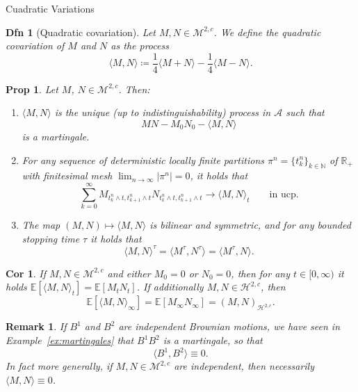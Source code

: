 \documentclass[a4paper]{article}
\theoremstyle{mytheoremstyle}
\newtheorem{definition}{Dfn}
\newtheorem{proposition}{Prop}
\newtheorem{corollary}{Cor}[theorem]
\newtheorem*{remark}{Remark}
\newcommand{\1}{\mathds{1}}
\begin{document}
\begin{multicols*}{3}
\begin{roundbox}{Cuadratic Variations}
\begin{definition}[Quadratic covariation]
  \label{defn:quadratic.covariation}Let $M, N \in \mathcal{M}^{2, c}$. We
  define the {\emph{quadratic covariation}} of $M$ and $N$ as the
  process
  \[ \langle M, N \rangle \coloneq \frac{1}{4} \langle M + N \rangle -
     \frac{1}{4} \langle M - N \rangle . \label{eq:quadratic.covariation} \]
\end{definition}

\begin{proposition}
  \label{prop:properties.quadratic.covariation}Let $M$, $N \in \mathcal{M}^{2,
  c}$. Then:
  \begin{enumerate}
    \item $\langle M, N \rangle$ is the unique (up to indistinguishability)
    process in $\mathcal{A}$ such that
    \[ M N - M_0 N_0 - \langle M, N \rangle \]
    is a martingale.
    
    \item For any sequence of deterministic locally finite partitions $\pi^n =
    \{ t^n_k \}_{k \in \mathbb{N}}$ of $\mathbb{R}_+$ with finitesimal mesh
    $\lim_{n \rightarrow \infty} | \pi^n | = 0$, it holds that
    \[ \sum_{k = 0}^{\infty} M_{t^n_k \wedge t, t^n_{k + 1} \wedge t} N_{t^n_k
       \wedge t, t^n_{k + 1} \wedge t} \rightarrow \langle M, N \rangle_t
       \qquad \text{in ucp} . \]
    \item The map $(M, N) \mapsto \langle M, N \rangle$ is bilinear and
    symmetric, and for any bounded stopping time $\tau$ it holds that
    \[ \langle M, N \rangle^{\tau} = \langle M^{\tau}, N^{\tau} \rangle =
       \langle M^{\tau}, N \rangle . \]
  \end{enumerate}
\end{proposition}

\begin{corollary}
  \label{cor:link.quadratic.product}If $M, N \in \mathcal{M}^{2, c}$ and
  either $M_0 = 0$ or $N_0 = 0$, then for any $t \in [0, \infty)$ it holds
  $\mathbb{E} [\langle M, N \rangle_t] =\mathbb{E} [M_t N_t]$. If additionally
  $M, N \in \mathcal{H}^{2, c}$, then
  \[ \mathbb{E} [\langle M, N \rangle_{\infty}] =\mathbb{E} [M_{\infty}
     N_{\infty}] = (M, N)_{\mathcal{H}^{2, c}} . \]
\end{corollary}

\begin{remark}
  \label{rem:qcv.independent-bm}If $B^1$ and $B^2$ are independent Brownian
  motions, we have seen in Example~\ref{ex:martingales} that $B^1 B^2$ is a
  martingale, so that
  \[ \langle B^1, B^2 \rangle \equiv 0. \]
  In fact more generally, if $M, N \in \mathcal{M}^{2, c}$ are independent,
  then necessarily $\langle M, N \rangle \equiv 0$.
\end{remark}
\end{roundbox}


\end{multicols*}
\end{document}
